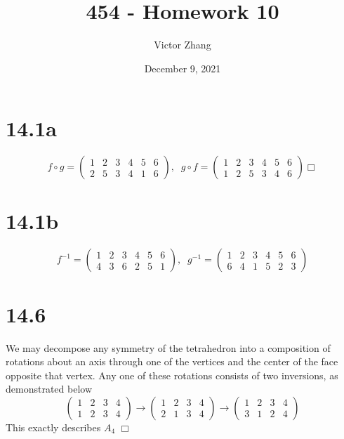 \documentclass{article}
\title{454 - Homework 10}
\author{Victor Zhang}
\date{December 9, 2021}
\begin{document}
\maketitle

\section*{14.1a}
\begin{equation*}
f \circ g =
\begin{pmatrix}
1 & 2 & 3 & 4 & 5 & 6\\
2 & 5 & 3 & 4 & 1 & 6
\end{pmatrix}, \;\;
g \circ f =
\begin{pmatrix}
1 & 2 & 3 & 4 & 5 & 6\\
1 & 2 & 5 & 3 & 4 & 6
\end{pmatrix}
\Box
\end{equation*}

\section*{14.1b}
\begin{equation*}
f^{-1} =
\begin{pmatrix}
1 & 2 & 3 & 4 & 5 & 6\\
4 & 3 & 6 & 2 & 5 & 1
\end{pmatrix}, \;\;
g^{-1} =
\begin{pmatrix}
1 & 2 & 3 & 4 & 5 & 6\\
6 & 4 & 1 & 5 & 2 & 3
\end{pmatrix}
\end{equation*}

\section*{14.6}
We may decompose any symmetry of the tetrahedron into a composition of rotations about an axis through one of the vertices and the center of the face opposite that vertex. Any one of these rotations consists of two inversions, as demonstrated below
\begin{equation*}
\begin{pmatrix}
1 & 2 & 3 & 4\\
1 & 2 & 3 & 4
\end{pmatrix} \to
\begin{pmatrix}
1 & 2 & 3 & 4\\
2 & 1 & 3 & 4
\end{pmatrix} \to
\begin{pmatrix}
1 & 2 & 3 & 4\\
3 & 1 & 2 & 4
\end{pmatrix}
\end{equation*}
This exactly describes $A_4$ $\Box$
\end{document}
